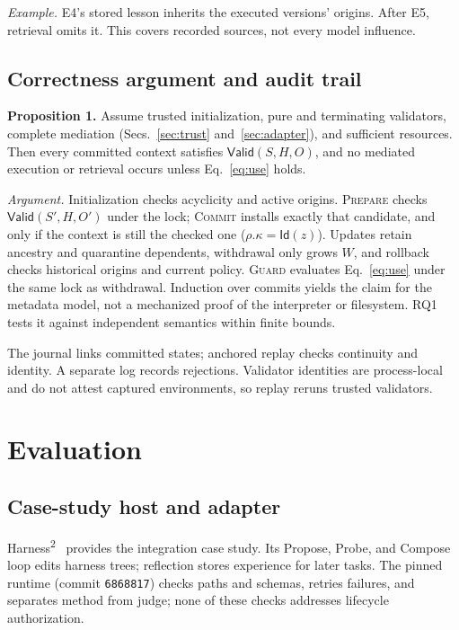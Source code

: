 \documentclass[letterpaper,journal]{IEEEtran}
\newcommand{\harness}{Harness\textsuperscript{2}}
\begin{document}
\textit{Example.} E4's stored lesson inherits the executed versions' origins. After E5, retrieval omits it. This covers recorded sources, not every model influence.

\subsection{Correctness argument and audit trail}
\textbf{Proposition 1.} Assume trusted initialization, pure and terminating validators, complete mediation (Secs.~\ref{sec:trust} and~\ref{sec:adapter}), and sufficient resources. Then every committed context satisfies $\mathsf{Valid}(S,H,O)$, and no mediated execution or retrieval occurs unless Eq.~\eqref{eq:use} holds.

\textit{Argument.} Initialization checks acyclicity and active origins. \textsc{Prepare} checks $\mathsf{Valid}(S',H,O')$ under the lock; \textsc{Commit} installs exactly that candidate, and only if the context is still the checked one ($\rho.\kappa=\mathsf{Id}(z)$). Updates retain ancestry and quarantine dependents, withdrawal only grows $W$, and rollback checks historical origins and current policy. \textsc{Guard} evaluates Eq.~\eqref{eq:use} under the same lock as withdrawal. Induction over commits yields the claim for the metadata model, not a mechanized proof of the interpreter or filesystem. RQ1 tests it against independent semantics within finite bounds.

The journal links committed states; anchored replay checks continuity and identity. A separate log records rejections. Validator identities are process-local and do not attest captured environments, so replay reruns trusted validators.


\section{Evaluation}\label{sec:evaluation}
\subsection{Case-study host and adapter}\label{sec:case-study}
\harness{}~\cite{harness2} provides the integration case study. Its Propose, Probe, and Compose loop edits harness trees; reflection stores experience for later tasks. The pinned runtime (commit \texttt{6868817}) checks paths and schemas, retries failures, and separates method from judge; none of these checks addresses lifecycle authorization.
\end{document}
